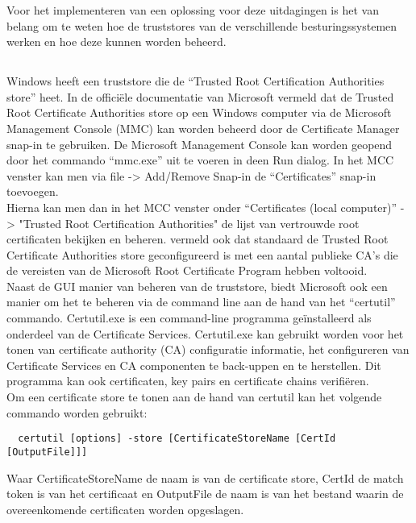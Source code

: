 Voor het implementeren van een oplossing voor deze uitdagingen is het van belang om te weten hoe de truststores van de verschillende besturingssystemen werken en hoe deze kunnen worden beheerd. \\

\subsection{}
\label{subsec:Windows_truststore}

Windows heeft een truststore die de ``Trusted Root Certification Authorities store'' heet.
In de officiële documentatie van Microsoft vermeld \textcite{MStruststore} dat de Trusted Root Certificate Authorities store op een Windows computer via de Microsoft Management Console (MMC) kan worden beheerd door de Certificate Manager snap-in te gebruiken.
De Microsoft Management Console kan worden geopend door het commando ``mmc.exe'' uit te voeren in deen Run dialog. In het MCC venster kan men via file -> Add/Remove Snap-in de ``Certificates'' snap-in toevoegen. \\

Hierna kan men dan in het MCC venster onder ``Certificates (local computer)'' -> "Trusted Root Certification Authorities" de lijst van vertrouwde root certificaten bekijken en beheren.
\textcite{MStruststore} vermeld ook dat standaard de Trusted Root Certificate Authorities store geconfigureerd is met een aantal publieke CA's die de vereisten van de Microsoft Root Certificate Program hebben voltooid. \\

Naast de GUI manier van beheren van de truststore, biedt Microsoft ook een manier om het te beheren via de command line aan de hand van het ``certutil'' commando.
Certutil.exe is een command-line programma geïnstalleerd als onderdeel van de Certificate Services. Certutil.exe kan gebruikt worden voor het tonen van certificate authority (CA) configuratie informatie, het configureren van Certificate Services en CA componenten te back-uppen en te herstellen.
Dit programma kan ook certificaten, key pairs en certificate chains verifiëren. \autocite{MScertutil} \\

Om een certificate store te tonen aan de hand van certutil kan het volgende commando worden gebruikt:
\begin{verbatim}
  certutil [options] -store [CertificateStoreName [CertId [OutputFile]]]
\end{verbatim}
Waar CertificateStoreName de naam is van de certificate store, CertId de match token is van het certificaat en OutputFile de naam is van het bestand waarin de overeenkomende certificaten worden opgeslagen. \autocite{MScertutil} \\

